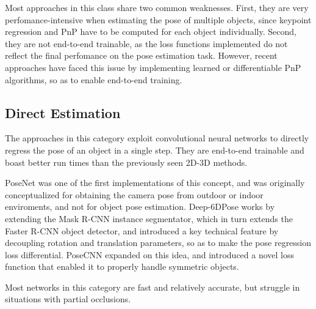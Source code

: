 Most approaches in this class share two common weaknesses. First, they are very perfomance-intensive when estimating the pose of multiple objects, since keypoint regression and PnP have to be computed for each object individually\cite{bukschat2020efficientpose}. Second, they are not end-to-end trainable, as the loss functions implemented do not reflect the final perfomance on the pose estimation task\cite{SS6D}. However, recent approaches have faced this issue by implementing learned or differentiable PnP algorithms, so as to enable end-to-end training\cite{EPro-Pnp}.

\subsection{Direct Estimation}
\label{ss:directestimation}

The approaches in this category exploit convolutional neural networks to directly regress the pose of an object in a single step. They are end-to-end trainable and boast better run times than the previously seen 2D-3D methods.

PoseNet\cite{PoseNet} was one of the first implementations of this concept, and was originally conceptualized for obtaining the camera pose from outdoor or indoor enviroments, and not for object pose estimation. Deep-6DPose\cite{deep6D} works by extending the Mask R-CNN\cite{Mask-R-CNN} instance segmentator, which in turn extends the Faster R-CNN\cite{Faster-R-CNN} object detector, and introduced a key technical feature by decoupling rotation and translation parameters, so as to make the pose regression loss differential. PoseCNN\cite{PoseCNN} expanded on this idea, and introduced a novel loss function that enabled it to properly handle symmetric objects.

Most networks in this category are fast and relatively accurate, but struggle in situations with partial occlusions.

